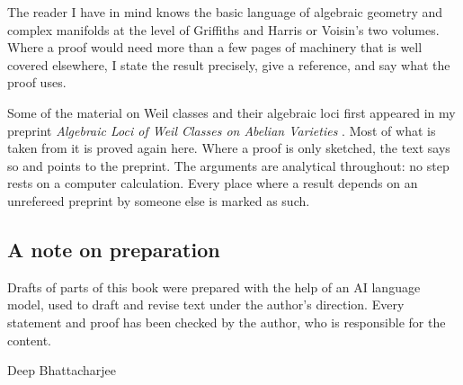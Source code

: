 The reader I have in mind knows the basic language of algebraic geometry
and complex manifolds at the level of Griffiths and Harris or Voisin's two
volumes. Where a proof would need more than a few pages of machinery that
is well covered elsewhere, I state the result precisely, give a reference,
and say what the proof uses.

Some of the material on Weil classes and their algebraic loci first
appeared in my preprint \emph{Algebraic Loci of Weil Classes on Abelian
Varieties} \cite{BhH8}. Most of what is taken from it is proved again here.
Where a proof is only sketched, the text says so and points to the
preprint. The arguments are analytical
throughout: no step rests on a computer calculation. Every place where a
result depends on an unrefereed preprint by someone else is marked as such.

\subsection*{A note on preparation}
Drafts of parts of this book were prepared with the help of an AI language
model, used to draft and revise text under the author's direction. Every
statement and proof has been checked by the author, who is responsible for
the content.

\bigskip
\noindent Deep Bhattacharjee
